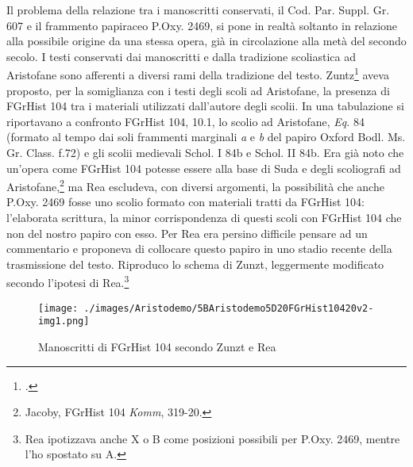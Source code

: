 Il problema della relazione tra i manoscritti
conservati, il Cod. Par. Suppl. Gr. 607 e il frammento
papiraceo P.Oxy. 2469, si pone in realtà soltanto
in relazione alla possibile origine da una stessa opera, già in circolazione
alla metà del secondo secolo. I testi conservati dai manoscritti e dalla
tradizione scoliastica ad Aristofane sono afferenti a diversi rami della
tradizione del testo.  Zuntz\footnote{\cite[658-677]{Zuntz1938}.} aveva proposto, per la somiglianza con i
testi degli scoli ad Aristofane, la presenza di FGrHist 104
tra i materiali utilizzati
dall'autore degli scolii. In una tabulazione si riportavano
a confronto
FGrHist 104, 10.1, lo scolio ad Aristofane, \textit{Eq.} 84 (formato al tempo
dai soli frammenti marginali \textit{a} e \textit{b} del papiro
Oxford Bodl. Ms. Gr. Class. f.72) e gli scolii medievali Schol. I 84b e
Schol. II 84b. Era già noto che un'opera come FGrHist 104
potesse essere alla base di Suda e degli scoliografi ad
Aristofane,\footnote{Jacoby, FGrHist 104 \textit{Komm},
319-20.} ma Rea escludeva, con diversi argomenti,
la possibilità che anche P.Oxy. 2469 fosse uno
scolio formato con materiali tratti da FGrHist 104:
l'elaborata scrittura, la minor corrispondenza di questi
scoli con FGrHist 104 che non del nostro papiro con esso. Per Rea era persino
difficile pensare ad un commentario e proponeva di collocare questo papiro in
uno stadio recente della trasmissione del testo. Riproduco lo
schema di Zunzt, leggermente modificato secondo l'ipotesi di
Rea.\footnote{Rea ipotizzava anche X o B come posizioni possibili per P.Oxy.
2469, mentre l'ho spostato su A.}

\begin{figure}[htbp]
\begin{center}
\texttt{[image: ./images/Aristodemo/5BAristodemo5D20FGrHist10420v2-img1.png]}
\caption{Manoscritti di FGrHist 104 secondo Zunzt e Rea}
\label{FGrHistZunztRea}
\end{center}
\end{figure}

